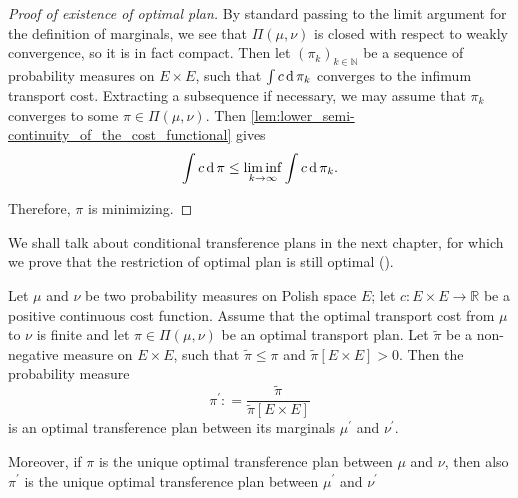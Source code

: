 \begin{proof}[Proof of existence of optimal plan]
	By standard passing to the limit argument for the definition of marginals,
	we see that \( \Pi ( \mu , \nu ) \) is closed with respect to weakly convergence,
	so it is in fact compact.
	Then let \( \left( \pi _ { k } \right) _ { k \in \mathbb{ N } } \) be a sequence of probability measures on \( E \times E \),
	such that \( \int c \operatorname{d} \pi _ { k } \) converges to the infimum transport cost.
	Extracting a subsequence if necessary, we may assume that \( \pi _ { k } \) converges to some \( \pi \in \Pi ( \mu , \nu ) \).
	Then \cref{lem:lower_semi-continuity_of_the_cost_functional} gives
	\[ \int c \operatorname{d} \pi \leq \liminf _ { k \rightarrow \infty } \int c \operatorname{d} \pi _ { k }. \]

	Therefore, $\pi$ is minimizing.
\end{proof}

We shall talk about conditional transference plans in the next chapter,
for which we prove that the restriction of optimal plan is still optimal (\cite[Theorem 4.6]{villani2008optimal}).

\begin{thm}
	\label{thm:restriction_optimal_plan}
	Let \(  \mu  \) and \(  \nu \) be two probability measures on Polish space $E$;
	let \( c : E \times E \rightarrow \mathbb{ R } \) be a positive continuous cost function.
	Assume that the optimal transport cost from \( \mu \) to \( \nu \) is finite
	and let \( \pi \in \Pi ( \mu , \nu ) \) be an optimal transport plan.
	Let \( \widetilde { \pi } \) be a non-negative measure on \( E \times E \),
	such that \( \widetilde { \pi } \leq \pi \)
	and \( \widetilde { \pi } [ E \times E ] > 0\).
	Then the probability measure
	\[ \pi ^ { \prime } : = \frac { \widetilde { \pi } } { \widetilde { \pi } [ E \times E ] } \]
	is an optimal transference plan between its marginals \( \mu ^ { \prime } \) and \( \nu ^ { \prime } \).

	Moreover, if \( \pi \) is the unique optimal transference plan between \( \mu \)
	and \( \nu \),
	then also \( \pi ^ { \prime } \) is the unique optimal transference plan between \( \mu ^ { \prime } \)
	and \( \nu ^ { \prime } \)
\end{thm}


